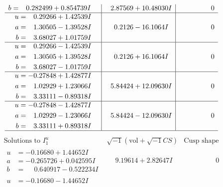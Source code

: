 \documentclass[1p]{elsarticle_modified}
\theoremstyle{definition}
\newcommand{\I}{\sqrt{-1}}
\begin{document}
$$\begin{array}{c|c|c}
\begin{aligned}
b &= \phantom{-}0.282499 + 0.854739 I\end{aligned}
 & \phantom{-}2.87569 + 10.48030 I & \phantom{-0.000000 } 0 \\ \hline\begin{aligned}
u &= \phantom{-}0.29266 + 1.42539 I \\
a &= \phantom{-}1.30505 - 1.39528 I \\
b &= \phantom{-}3.68027 + 1.01759 I\end{aligned}
 & \phantom{-}0.2126 - 16.1064 I & \phantom{-0.000000 } 0 \\ \hline\begin{aligned}
u &= \phantom{-}0.29266 - 1.42539 I \\
a &= \phantom{-}1.30505 + 1.39528 I \\
b &= \phantom{-}3.68027 - 1.01759 I\end{aligned}
 & \phantom{-}0.2126 + 16.1064 I & \phantom{-0.000000 } 0 \\ \hline\begin{aligned}
u &= -0.27848 + 1.42877 I \\
a &= \phantom{-}1.02929 + 1.23066 I \\
b &= \phantom{-}3.33111 - 0.89318 I\end{aligned}
 & \phantom{-}5.84424 + 12.09630 I & \phantom{-0.000000 } 0 \\ \hline\begin{aligned}
u &= -0.27848 - 1.42877 I \\
a &= \phantom{-}1.02929 - 1.23066 I \\
b &= \phantom{-}3.33111 + 0.89318 I\end{aligned}
 & \phantom{-}5.84424 - 12.09630 I & \phantom{-0.000000 } 0\\
 \hline 
 \end{array}$$\newpage$$\begin{array}{c|c|c}  
\text{Solutions to }I^u_{1}& \I (\text{vol} + \sqrt{-1}CS) & \text{Cusp shape}\\
 \hline 
\begin{aligned}
u &= -0.16680 + 1.44652 I \\
a &= -0.265726 + 0.042595 I \\
b &= \phantom{-}0.640917 - 0.522234 I\end{aligned}
 & \phantom{-}9.19614 + 2.82647 I & \phantom{-0.000000 } 0 \\ \hline\begin{aligned}
u &= -0.16680 - 1.44652 I \\

\end{aligned}
\end{array}$$
\end{document}
